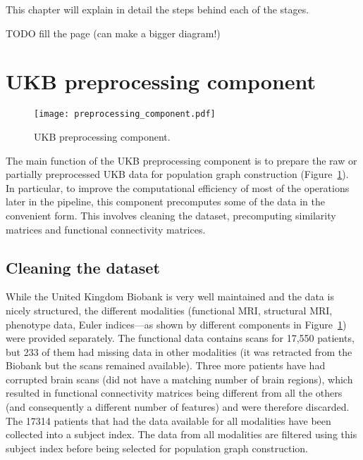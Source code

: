 This chapter will explain in detail the steps behind each of the stages.

TODO fill the page (can make a bigger diagram!)


\section{UKB preprocessing component}

\begin{figure}[!htb]
    \centering
    \texttt{[image: preprocessing\_component.pdf]}
    \caption{UKB preprocessing component.}\label{preprocessing-component}
\end{figure}

The main function of the UKB preprocessing component is to prepare the raw or partially preprocessed UKB data for population graph construction (Figure~\ref{preprocessing-component}). In particular, to improve the computational efficiency of most of the operations later in the pipeline, this component precomputes some of the data in the convenient form. This involves cleaning the dataset, precomputing similarity matrices and functional connectivity matrices.

\subsection{Cleaning the dataset}
While the United Kingdom Biobank is very well maintained and the data is nicely structured, the different modalities (functional MRI, structural MRI, phenotype data, Euler indices—as shown by different components in Figure~\ref{preprocessing-component}) were provided separately. The functional data contains scans for 17,550 patients, but 233 of them had missing data in other modalities (it was retracted from the Biobank but the scans remained available). Three more patients have had corrupted brain scans (did not have a matching number of brain regions), which resulted in functional connectivity matrices being different from all the others (and consequently a different number of features) and were therefore discarded. The 17314 patients that had the data available for all modalities have been collected into a subject index. The data from all modalities are filtered using this subject index before being selected for population graph construction.

